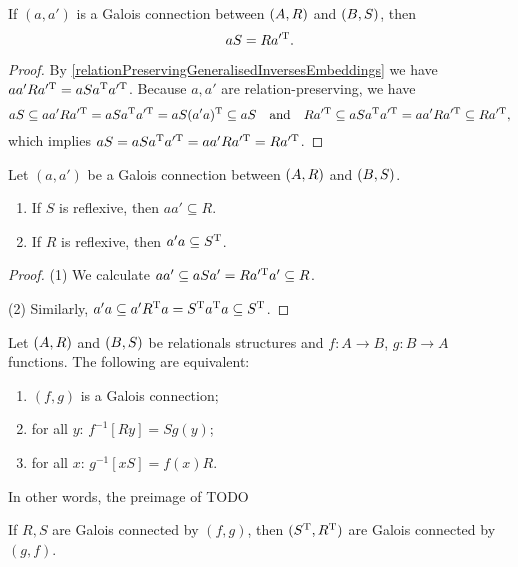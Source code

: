 \begin{proposition} \label{GaloisIdentity}
If $(a,a')$ is a Galois connection between $\left( A,R \right)$ and $\left( B,S \right)$, then
\[ aS = Ra^{\prime \mathrm{T}}. \]
\end{proposition}
\begin{proof}
By \ref{relationPreservingGeneralisedInversesEmbeddings} we have $aa'R a^{\prime\mathrm{T}} = aSa^{\mathrm{T}} a^{\prime\mathrm{T}}$. Because $a,a'$ are relation-preserving, we have
\[ aS \subseteq aa'R a^{\prime\mathrm{T}} = aSa^{\mathrm{T}} a^{\prime\mathrm{T}} = aS(a'a)^{\mathrm{T}} \subseteq aS \quad\text{and}\quad Ra^{\prime\mathrm{T}} \subseteq aSa^{\mathrm{T}} a^{\prime\mathrm{T}} = aa'R a^{\prime\mathrm{T}} \subseteq Ra^{\prime\mathrm{T}}, \]
which implies $aS = aSa^{\mathrm{T}} a^{\prime\mathrm{T}} = aa'R a^{\prime\mathrm{T}} = Ra^{\prime\mathrm{T}}$.
\end{proof}
\begin{corollary} \label{reflexiveGaloisCorollary}
Let $(a,a')$ be a Galois connection between $\left( A,R \right)$ and $\left( B,S \right)$.
\begin{enumerate}
\item If $S$ is reflexive, then $aa' \subseteq R$.
\item If $R$ is reflexive, then $a'a \subseteq S^{\mathrm{T}}$.
\end{enumerate}
\end{corollary}
\begin{proof}
(1) We calculate $aa' \subseteq aSa' = Ra^{\prime \mathrm{T}}a' \subseteq R$.

(2) Similarly, $a'a \subseteq a'R^{\mathrm{T}} a = S^{\mathrm{T}} a^{\mathrm{T}} a \subseteq S^{\mathrm{T}}$.
\end{proof}

\begin{lemma}
Let $\left( A, R \right)$ and $\left( B, S \right)$ be relationals structures and $f: A\to B$, $g: B\to A$ functions.
The following are equivalent:
\begin{enumerate}
\item $(f,g)$ is a Galois connection;
\item for all $y$: $f^{-1}[Ry] = Sg(y)$;
\item for all $x$: $g^{-1}[xS] = f(x)R$.
\end{enumerate}
In other words, the preimage of  TODO
\end{lemma}

\begin{lemma}
If $R,S$ are Galois connected by $(f,g)$, then $(S^{\mathrm{T}}, R^{\mathrm{T}})$ are Galois connected by $(g,f)$.
\end{lemma}

